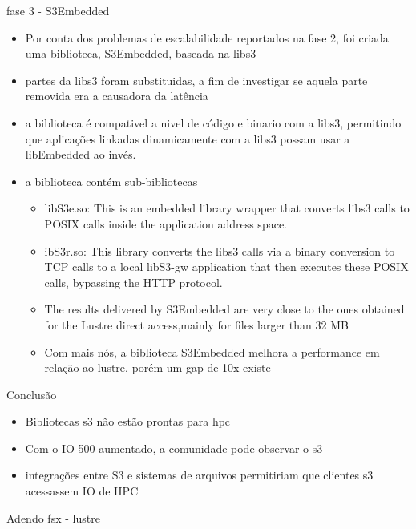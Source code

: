 \documentclass{beamer}
\begin{document}
\begin{frame}{fase 3 - S3Embedded}
	\begin{itemize}
		\item Por conta dos problemas de escalabilidade reportados na fase 2, foi criada uma biblioteca, S3Embedded, baseada na libs3
		\item partes da libs3 foram substituidas, a fim de investigar se aquela parte removida era a causadora da latência
		\item a biblioteca é compativel a nivel de código e binario com a libs3, permitindo que aplicações linkadas dinamicamente com a libs3 possam usar a libEmbedded ao invés.
		\item a biblioteca contém sub-bibliotecas
		\begin{itemize}
			\item libS3e.so: This is an embedded library wrapper that converts libs3 calls to POSIX calls
			inside the application address space.
			\item ibS3r.so: This library converts the libs3 calls via a binary conversion to TCP calls to a local
			libS3-gw application that then executes these POSIX calls, bypassing the HTTP protocol.
			\item The results delivered by S3Embedded are very close to the ones obtained for the
			Lustre direct access,mainly for files larger than 32 MB
			\item Com mais nós, a biblioteca S3Embedded melhora a performance em relação ao lustre, porém um gap de 10x existe
		\end{itemize}
	\end{itemize}
\end{frame}
\begin{frame}{Conclusão}
	\begin{itemize}
		\item Bibliotecas s3 não estão prontas para hpc
		\item Com o IO-500 aumentado, a comunidade pode observar o s3
		\item integrações entre S3 e sistemas de arquivos permitiriam que clientes s3 acessassem IO de HPC
	\end{itemize}
\end{frame}
\begin{frame}{Adendo}
    fsx - lustre
\end{frame}
\end{document}
